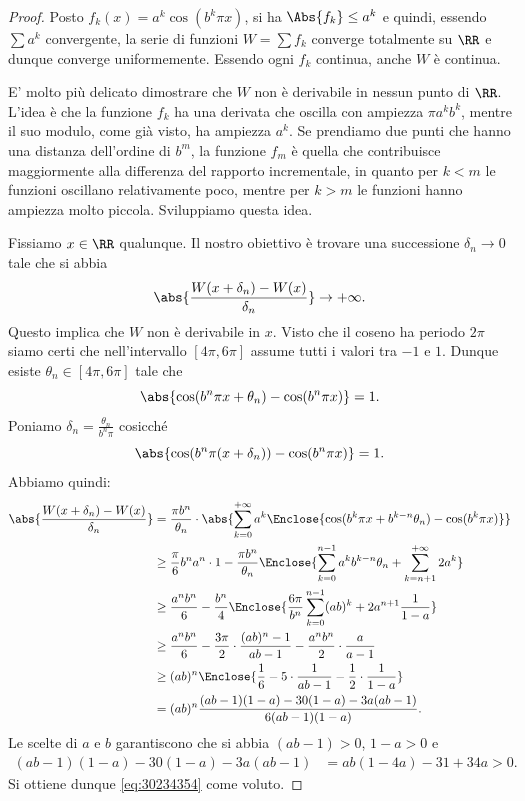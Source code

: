 \begin{proof}
Posto $f_k(x) = a^k \cos(b^k \pi x)$,
si ha $\Abs{f_k} \leq a^k$ e quindi, essendo $\sum a^k$ convergente, 
la serie di funzioni $W = \sum f_k$
converge totalmente su $\RR$ e dunque converge uniformemente.
Essendo ogni $f_k$ continua, anche $W$ è continua.

E' molto più delicato dimostrare che $W$ non è derivabile in nessun punto di $\RR$.
L'idea è che la funzione $f_k$ ha una derivata 
che oscilla con ampiezza $\pi a^k b^k$, mentre il suo modulo, come già visto,
ha ampiezza $a^k$. 
Se prendiamo due punti che hanno una distanza dell'ordine di $b^m$,
la funzione $f_m$ è quella che contribuisce maggiormente alla differenza 
del rapporto incrementale, in quanto per $k<m$ le funzioni oscillano relativamente 
poco, mentre per $k>m$ le funzioni hanno ampiezza molto piccola.
Sviluppiamo questa idea.

Fissiamo $x\in \RR$ qualunque. 
Il nostro obiettivo è trovare una successione $\delta_n\to 0$ 
tale che si abbia
\begin{equation}\label{eq:30234354}
  \abs{\frac{W(x+\delta_n) - W(x)}{\delta_n}} \to +\infty.
\end{equation}
Questo implica che $W$ non è derivabile in $x$.
Visto che il coseno ha periodo $2\pi$ siamo certi che nell'intervallo 
$[4\pi,6\pi]$ assume tutti i valori tra $-1$ e $1$. 
Dunque esiste $\theta_n \in [4\pi,6\pi]$ tale che 
\[
   \abs{\cos (b^n \pi x + \theta_n) - \cos(b^n\pi x)} = 1.
\]
Poniamo $\delta_n = \frac{\theta_n}{b^n \pi}$ cosicché
\[
  \abs{\cos (b^n \pi (x+\delta_n))- \cos(b^n \pi x)} = 1.
\]
Abbiamo quindi:
\begin{align*}
    \abs{\frac{W(x+\delta_n) - W(x)}{\delta_n}} 
    &= \frac{\pi b^n}{\theta_n}\cdot \abs{\sum_{k=0}^{+\infty}a^k\Enclose{\cos(b^k\pi x + b^{k-n}\theta_n) - \cos(b^k \pi x)}}  \\
    &\ge \frac{\pi}{6}b^n a^n\cdot 1 - \frac{\pi b^n}{\theta_n}\Enclose{\sum_{k=0}^{n-1} a^k b^{k-n} \theta_n + \sum_{k=n+1}^{+\infty} 2a^k} \\
    &\ge \frac{a^n b^n}{6} - \frac{b^n}{4}\Enclose{\frac{6\pi}{b^n}\sum_{k=0}^{n-1} (ab)^k + 2 a^{n+1} \frac{1}{1-a}} \\
    &\ge \frac{a^n b^n}{6} -\frac {3\pi} 2\cdot  \frac{(ab)^n-1}{ab-1} - \frac{a^n b^n}{2}\cdot \frac{a}{a-1}\\
    &\ge (ab)^n \Enclose{\frac 1 6 - 5\cdot \frac{1}{ab-1} - \frac 1 2 \cdot \frac{1}{1-a}} \\
    &= (ab)^n \frac{(ab-1)(1-a)-30(1-a)-3a(ab-1)}{6(ab-1)(1-a)}.
\end{align*}
Le scelte di $a$ e $b$ garantiscono che
si abbia $(ab-1)>0$, $1-a>0$ e
\begin{align*}
(ab-1)(1-a)-30(1-a)-3a(ab-1)
&= ab(1-4a) - 31 + 34a > 0.
\end{align*}
Si ottiene dunque \eqref{eq:30234354} come voluto.
\end{proof}



